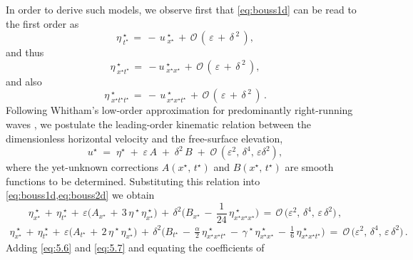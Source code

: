 \documentclass[alpha-refs, 12pt]{wiley-article}
\renewcommand{\O}{\mathcal{O}}
\newcommand{\eps}{\varepsilon}
\begin{document}
In order to derive such models, we observe first that \cref{eq:bouss1d} can be read to the first order as
\begin{equation*}
  \eta^{\;\star}_{\;t^{\star}}\,=\,-\,u^{\;\star}_{\;x^{\star}}\,+\,\O\,(\,\eps\,+\,\delta^{\;2}\,),
\end{equation*}
and thus
\begin{equation*}
  \eta^{\;\star}_{\;x^{\star}t^{\star}}\, = \,-u^{\;\star}_{\;x^{\star}x^{\star}}\,+\,\O\,(\,\eps\,+\,\delta^{\;2}\,),
\end{equation*}
and also
\begin{equation*}
  \eta^{\;\star}_{\;x^{\star}t^{\star}t^{\star}}\, = \,-\,u^{\;\star}_{\,x^{\star}x^{\star}t^{\star}}\,+\,\O\,(\,\eps\,+\,\delta^{\;2}\,)\,.
\end{equation*}
Following Whitham's low-order approximation for predominantly right-running waves \citep{Whitham1999, Dutykh2007}, we postulate the leading-order kinematic relation between the dimensionless horizontal velocity and the free-surface elevation,
\begin{equation}\label{eq:relation}
  u^{\star}\;=\;\eta^{\star}\;+\;\eps\,A\;+\;\delta^{2}\,B\; + \;\O\,(\eps^{2},\,\delta^{4},\,\eps\delta^{2}),
\end{equation}
where the yet-unknown corrections $A(x^{\star},\,t^{\star})$ and $B(x^{\star},\,t^{\star})$ are smooth functions to be determined. Substituting this relation into \cref{eq:bouss1d,eq:bouss2d} we obtain
\begin{equation}\label{eq:5.6}
  \eta^{\;\star}_{x^{\star}}\,+\,\eta^{\;\star}_{t^{\star}}\,+\,
  \eps\bigl(A_{x^{\star}}\,+\,3\,\eta^{\;\star}\,\eta^{\;\star}_{x^{\star}}\bigr)\,+\,
  \delta^{2}\bigl(B_{x^{\star}}\,-\,\frac{1}{24}\,\eta^{\;\star}_{x^{\star}x^{\star}x^{\star}}\bigr)
  \,=\,\O\,\bigl(\eps^{2},\,\delta^{4},\,\eps\,\delta^{2}\bigr)\,,
\end{equation}
\begin{multline}\label{eq:5.7}
  \eta^{\;\star}_{x^{\star}}\,+\,\eta^{\;\star}_{t^{\star}}\,+\,
  \eps\bigl(A_{t^{\star}}\,+\,2\,\eta^{\;\star}\,\eta^{\;\star}_{x^{\star}}\bigr)\,+\,
  \delta^{2}\bigl(B_{t^{\star}}\,-\,\frac{\alpha}{2}\,\eta^{\;\star}_{x^{\star}x^{\star}t^{\star}}\,-\,
  \gamma^{\;\star}\,\eta^{\;\star}_{x^{\star}x^{\star}}\,-\,\frac{1}{6}\,\eta^{\;\star}_{x^{\star}x^{\star}t^{\star}}\bigr)\ =\ \O\,\bigl(\eps^{2},\,\delta^{4},\,\eps\,\delta^{2}\bigr)\,.
\end{multline}
Adding \cref{eq:5.6} and \cref{eq:5.7} and equating the coefficients of
\end{document}
